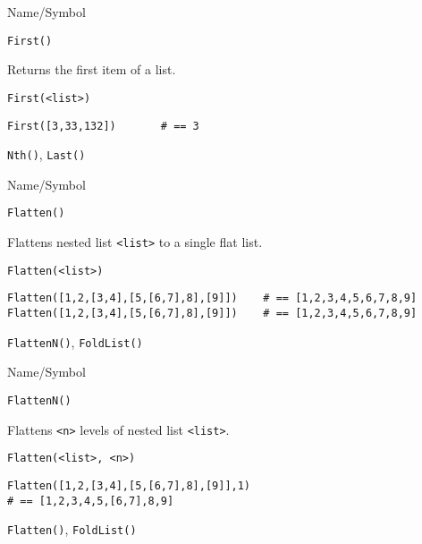 \rl




\begin{desc}{Name/Symbol}
\item[Name/Symbol]	\verb+First()+

\item[Description]	Returns the first item of a list.

\item[Usage]
\begin{verbatim}
First(<list>)
\end{verbatim}

\item[Example]
\begin{verbatim}
First([3,33,132])		# == 3
\end{verbatim}

\item[See Also]	\verb+Nth()+, \verb+Last()+
\end{desc}

\rl



\begin{desc}{Name/Symbol}
\item[Name/Symbol]	\verb+Flatten()+

\item[Description]
	Flattens nested list \verb+<list>+ to a single flat list.

\item[Usage]
\begin{verbatim}
Flatten(<list>)
\end{verbatim}

\item[Example]
\begin{verbatim}
Flatten([1,2,[3,4],[5,[6,7],8],[9]])	# == [1,2,3,4,5,6,7,8,9]
Flatten([1,2,[3,4],[5,[6,7],8],[9]])	# == [1,2,3,4,5,6,7,8,9]
\end{verbatim}

\item[See Also]	\verb+FlattenN()+, \verb+FoldList()+
\end{desc}

\rl




\begin{desc}{Name/Symbol}
\item[Name/Symbol]	\verb+FlattenN()+

\item[Description]	Flattens \verb+<n>+ levels of nested list \verb+<list>+. 

\item[Usage]
\begin{verbatim}
Flatten(<list>, <n>)
\end{verbatim}

\item[Example]
\begin{verbatim}
Flatten([1,2,[3,4],[5,[6,7],8],[9]],1) 
# == [1,2,3,4,5,[6,7],8,9]
\end{verbatim}

\item[See Also]	\verb+Flatten()+, \verb+FoldList()+
\end{desc}

